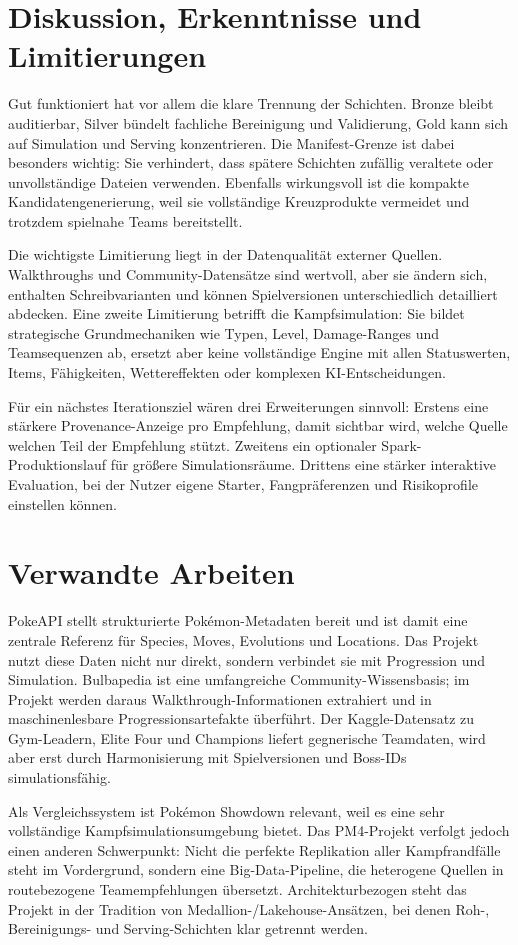 \documentclass[sigconf,nonacm]{acmart}
\begin{document}
\section{Diskussion, Erkenntnisse und Limitierungen}
Gut funktioniert hat vor allem die klare Trennung der Schichten. Bronze bleibt auditierbar, Silver bündelt fachliche Bereinigung und Validierung, Gold kann sich auf Simulation und Serving konzentrieren. Die Manifest-Grenze ist dabei besonders wichtig: Sie verhindert, dass spätere Schichten zufällig veraltete oder unvollständige Dateien verwenden. Ebenfalls wirkungsvoll ist die kompakte Kandidatengenerierung, weil sie vollständige Kreuzprodukte vermeidet und trotzdem spielnahe Teams bereitstellt.

Die wichtigste Limitierung liegt in der Datenqualität externer Quellen. Walkthroughs und Community-Datensätze sind wertvoll, aber sie ändern sich, enthalten Schreibvarianten und können Spielversionen unterschiedlich detailliert abdecken. Eine zweite Limitierung betrifft die Kampfsimulation: Sie bildet strategische Grundmechaniken wie Typen, Level, Damage-Ranges und Teamsequenzen ab, ersetzt aber keine vollständige Engine mit allen Statuswerten, Items, Fähigkeiten, Wettereffekten oder komplexen KI-Entscheidungen.

Für ein nächstes Iterationsziel wären drei Erweiterungen sinnvoll: Erstens eine stärkere Provenance-Anzeige pro Empfehlung, damit sichtbar wird, welche Quelle welchen Teil der Empfehlung stützt. Zweitens ein optionaler Spark-Produktionslauf für größere Simulationsräume. Drittens eine stärker interaktive Evaluation, bei der Nutzer eigene Starter, Fangpräferenzen und Risikoprofile einstellen können.

\section{Verwandte Arbeiten}
PokeAPI stellt strukturierte Pokémon-Metadaten bereit und ist damit eine zentrale Referenz für Species, Moves, Evolutions und Locations. Das Projekt nutzt diese Daten nicht nur direkt, sondern verbindet sie mit Progression und Simulation. Bulbapedia ist eine umfangreiche Community-Wissensbasis; im Projekt werden daraus Walkthrough-Informationen extrahiert und in maschinenlesbare Progressionsartefakte überführt. Der Kaggle-Datensatz zu Gym-Leadern, Elite Four und Champions liefert gegnerische Teamdaten, wird aber erst durch Harmonisierung mit Spielversionen und Boss-IDs simulationsfähig.

Als Vergleichssystem ist Pokémon Showdown relevant, weil es eine sehr vollständige Kampfsimulationsumgebung bietet. Das PM4-Projekt verfolgt jedoch einen anderen Schwerpunkt: Nicht die perfekte Replikation aller Kampfrandfälle steht im Vordergrund, sondern eine Big-Data-Pipeline, die heterogene Quellen in routebezogene Teamempfehlungen übersetzt. Architekturbezogen steht das Projekt in der Tradition von Medallion-/Lakehouse-Ansätzen, bei denen Roh-, Bereinigungs- und Serving-Schichten klar getrennt werden.
\end{document}
